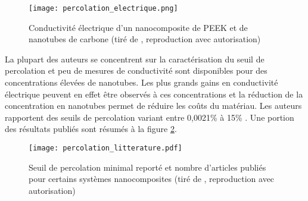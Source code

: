 \begin{figure}[h]
	\centering
	\texttt{[image: percolation\_electrique.png]}
	\caption{Conductivité électrique d'un nanocomposite de PEEK et de nanotubes de carbone (tiré de \cite{Bangarusampath2009}, reproduction avec autorisation)}
	\label{fig:percolation_electrique}
\end{figure}

La plupart des auteurs se concentrent sur la caractérisation du seuil de percolation et peu de mesures de conductivité sont disponibles pour des concentrations élevées de nanotubes. 
Les plus grands gains en conductivité électrique peuvent en effet être observés à ces concentrations et la réduction de la concentration en nanotubes permet de réduire les coûts du matériau. 
Les auteurs rapportent des seuils de percolation variant entre 0,0021\% à 15\% \cite{Bauhofer2009}. 
Une portion des résultats publiés sont résumés à la figure \ref{fig:percolation_articles}. 

\begin{figure}[h]
	\centering
	\texttt{[image: percolation\_litterature.pdf]}
	\caption{Seuil de percolation minimal reporté et nombre d'articles publiés pour certains systèmes nanocomposites (tiré de \cite{Bauhofer2009}, reproduction avec autorisation)}
	\label{fig:percolation_articles}
\end{figure}

